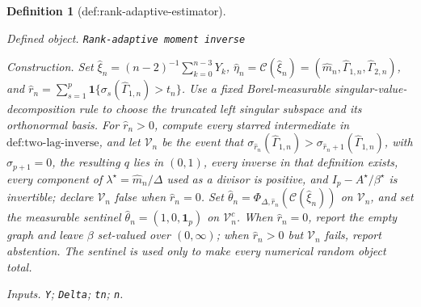 \documentclass{article}
\newtheorem{definition}{Definition}
\begin{document}
\begin{definition}[def:rank-adaptive-estimator]\label{def:rank-adaptive-estimator}
\par\smallskip\noindent\emph{Defined object.} \texttt{Rank-\allowbreak{}adaptive moment inverse}
\par\smallskip\noindent\emph{Construction.} Set \(\widehat\xi_n=(n-2)^{-1}\sum_{k=0}^{n-3}Y_k\), \(\widehat\eta_n=\mathcal C(\widehat\xi_n)=(\widehat m_n,\widehat\Gamma_{1,n},\widehat\Gamma_{2,n})\), and \(\widehat r_n=\sum_{s=1}^p\mathbf1\{\sigma_s(\widehat\Gamma_{1,n})>t_n\}\). Use a fixed Borel-measurable singular-value-decomposition rule to choose the truncated left singular subspace and its orthonormal basis. For \(\widehat r_n>0\), compute every starred intermediate in \(\text{def:two-lag-inverse}\), and let \(\mathcal V_n\) be the event that \(\sigma_{\widehat r_n}(\widehat\Gamma_{1,n})>\sigma_{\widehat r_n+1}(\widehat\Gamma_{1,n})\), with \(\sigma_{p+1}=0\), the resulting \(q\) lies in \((0,1)\), every inverse in that definition exists, every component of \(\lambda^\star=\widehat m_n/\Delta\) used as a divisor is positive, and \(I_p-A^\star/\beta^\star\) is invertible; declare \(\mathcal V_n\) false when \(\widehat r_n=0\). Set \(\widehat\theta_n=\Phi_{\Delta,\widehat r_n}(\mathcal C(\widehat\xi_n))\) on \(\mathcal V_n\), and set the measurable sentinel \(\widehat\theta_n=(1,0,\mathbf1_p)\) on \(\mathcal V_n^c\). When \(\widehat r_n=0\), report the empty graph and leave \(\beta\) set-valued over \((0,\infty)\); when \(\widehat r_n>0\) but \(\mathcal V_n\) fails, report abstention. The sentinel is used only to make every numerical random object total.
\par\smallskip\noindent\emph{Inputs.} \texttt{Y}; \texttt{Delta}; \texttt{tn}; \texttt{n}.
\end{definition}
\end{document}
